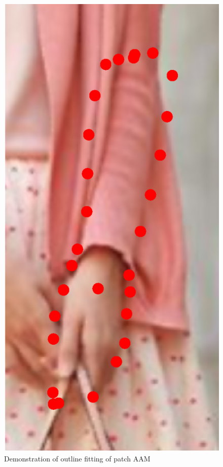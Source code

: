 \begin{figure}[t!]
    \includegraphics[height=\ofh]{resources/Fittings/39.eps}
    \caption{Demonstration of outline fitting of patch AAM}
    \label{fig:outline_fitting}
\end{figure}